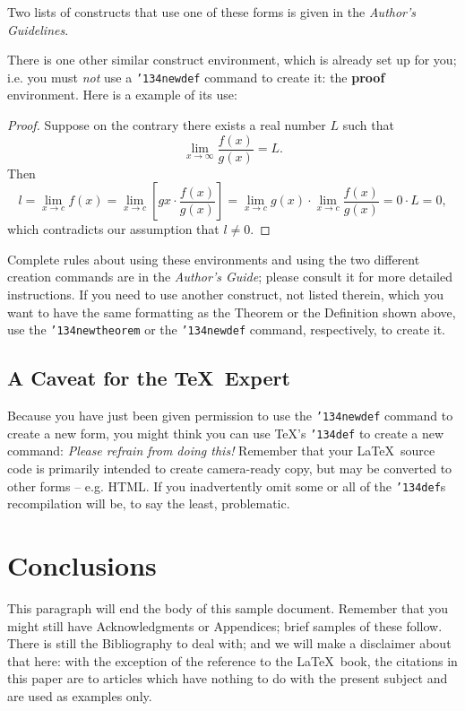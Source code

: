 \documentclass{sig-alternate-05-2015}
\begin{document}
Two lists of constructs that use one of these
forms is given in the
\textit{Author's  Guidelines}.

There is one other similar construct environment, which is
already set up
for you; i.e. you must \textit{not} use
a \texttt{{\char'134}newdef} command to
create it: the \textbf{proof} environment.  Here
is a example of its use:
\begin{proof}
Suppose on the contrary there exists a real number $L$ such that
\begin{displaymath}
\lim_{x\rightarrow\infty} \frac{f(x)}{g(x)} = L.
\end{displaymath}
Then
\begin{displaymath}
l=\lim_{x\rightarrow c} f(x)
= \lim_{x\rightarrow c}
\left[ g{x} \cdot \frac{f(x)}{g(x)} \right ]
= \lim_{x\rightarrow c} g(x) \cdot \lim_{x\rightarrow c}
\frac{f(x)}{g(x)} = 0\cdot L = 0,
\end{displaymath}
which contradicts our assumption that $l\neq 0$.
\end{proof}

Complete rules about using these environments and using the
two different creation commands are in the
\textit{Author's Guide}; please consult it for more
detailed instructions.  If you need to use another construct,
not listed therein, which you want to have the same
formatting as the Theorem
or the Definition\cite{salas:calculus} shown above,
use the \texttt{{\char'134}newtheorem} or the
\texttt{{\char'134}newdef} command,
respectively, to create it.

\subsection*{A {\secit Caveat} for the \TeX\ Expert}
Because you have just been given permission to
use the \texttt{{\char'134}newdef} command to create a
new form, you might think you can
use \TeX's \texttt{{\char'134}def} to create a
new command: \textit{Please refrain from doing this!}
Remember that your \LaTeX\ source code is primarily intended
to create camera-ready copy, but may be converted
to other forms -- e.g. HTML. If you inadvertently omit
some or all of the \texttt{{\char'134}def}s recompilation will
be, to say the least, problematic.

\section{Conclusions}
This paragraph will end the body of this sample document.
Remember that you might still have Acknowledgments or
Appendices; brief samples of these
follow.  There is still the Bibliography to deal with; and
we will make a disclaimer about that here: with the exception
of the reference to the \LaTeX\ book, the citations in
this paper are to articles which have nothing to
do with the present subject and are used as
examples only.
\end{document}
